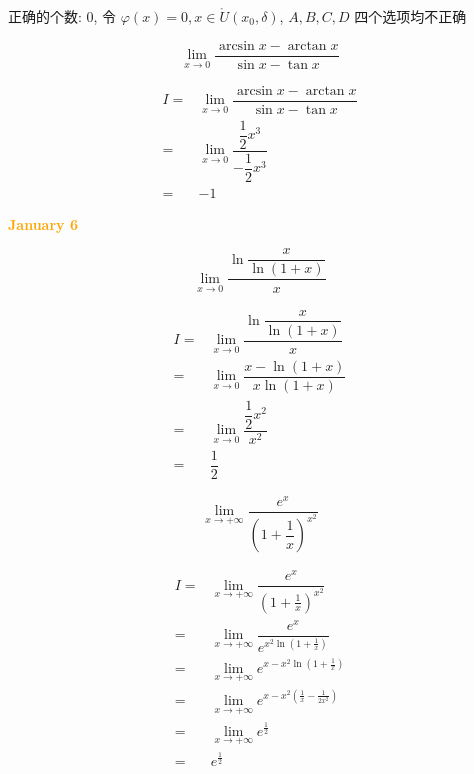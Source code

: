 \begin{solution}

	正确的个数: $0$, 令 $\varphi(x) = 0,x\in \mathring{U}(x_{0},\delta)$, $A,B,C,D$ 四个选项均不正确
\end{solution}

\begin{example}[][Exam: 27.1.15]
	$$\lim\limits_{x\to 0}\dfrac{\arcsin x-\arctan x}{\sin x-\tan x}$$
\end{example}

\begin{solution}

	\begin{align*}
		I = & \lim\limits_{x\to 0}\dfrac{\arcsin x-\arctan x}{\sin x-\tan x}\\
		  = & \lim\limits_{x\to 0}\dfrac{\dfrac{1}{2}x^{3}}{-\dfrac{1}{2}x^{3}}\\
		  = & -1 
	\end{align*}
\end{solution}

\textcolor{orange}{\textbf{January 6}}

\begin{example}[][Exam: 27.1.16]
	$$\lim\limits_{x\to 0}\dfrac{\ln\dfrac{x}{\ln(1+x)}}{x}$$
\end{example}

\begin{solution}

	\begin{align*}
		I = & \lim\limits_{x\to 0}\dfrac{\ln\dfrac{x}{\ln(1+x)}}{x}\\
		  = & \lim\limits_{x\to 0}\dfrac{x-\ln(1+x)}{x\ln (1+x)}\\
		  = & \lim\limits_{x\to 0}\dfrac{\dfrac{1}{2}x^{2}}{x^{2}}\\
		  = & \dfrac{1}{2}
	\end{align*}
\end{solution}

\begin{example}[][Exam: 27.1.17]
	$$\lim\limits_{x\to +\infty}\dfrac{e^{x}}{(1+\dfrac{1}{x})^{x^{2}}}$$
\end{example}

\begin{solution}
	
	\begin{align*}
		I = & \lim\limits_{x\to +\infty}\dfrac{e^{x}}{(1+\frac{1}{x})^{x^{2}}}\\
		  = & \lim\limits_{x\to +\infty}\dfrac{e^{x}}{e^{x^{2}\ln(1+\frac{1}{x})}}\\
		  = & \lim\limits_{x\to +\infty}e^{x-x^{2}\ln(1+\frac{1}{x})}\\
		  = & \lim\limits_{x\to +\infty}e^{x-x^{2}(\frac{1}{x}-\frac{1}{2x^{2}})}\\
		  = & \lim\limits_{x\to +\infty}e^{\frac{1}{2}}\\
		  = & e^{\frac{1}{2}}
	\end{align*}
\end{solution}

